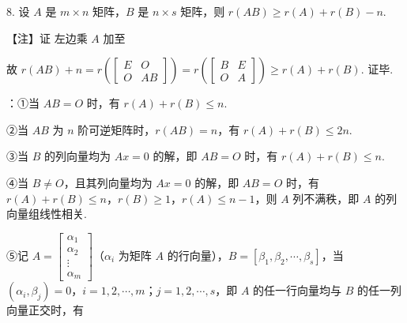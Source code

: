 8. 设 $A$ 是 $m\times n$ 矩阵，$B$ 是 $n\times s$ 矩阵，则 $r(AB)\ge r(A)+r(B)-n$.

\begin{fnote}
【注】证 左边乘 $A$ 加至



故 $r(AB)+n=r\left(\begin{bmatrix}E&O\\O&AB\end{bmatrix}\right)=r\left(\begin{bmatrix}B&E\\O&A\end{bmatrix}\right)\ge r(A)+r(B)$. 证毕.

：①当 $AB=O$ 时，有 $r(A)+r(B)\le n$.

②当 $AB$ 为 $n$ 阶可逆矩阵时，$r(AB)=n$，有 $r(A)+r(B)\le 2n$.

③当 $B$ 的列向量均为 $Ax=0$ 的解，即 $AB=O$ 时，有 $r(A)+r(B)\le n$.

④当 $B\ne O$，且其列向量均为 $Ax=0$ 的解，即 $AB=O$ 时，有 $r(A)+r(B)\le n$，$r(B)\ge1$，$r(A)\le n-1$，则 $A$ 列不满秩，即 $A$ 的列向量组线性相关.

⑤记 $A=\begin{bmatrix}\alpha_1\\\alpha_2\\\vdots\\\alpha_m\end{bmatrix}$（$\alpha_i$ 为矩阵 $A$ 的行向量），$B=[\beta_1,\beta_2,\cdots,\beta_s]$，当 $(\alpha_i,\beta_j)=0$，$i=1,2,\cdots,m$；$j=1,2,\cdots,s$，即 $A$ 的任一行向量均与 $B$ 的任一列向量正交时，有


\end{fnote}
